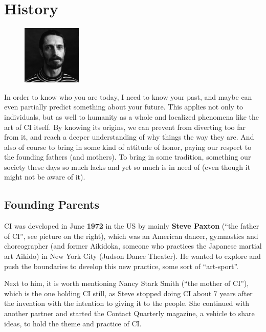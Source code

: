 \section{History}\label{sec:history}

\begin{figure}
\centering
\includegraphics[width=0.25\textwidth]{images/history}
\end{figure}

In order to know who you are today, I need to know your past, and maybe can even partially predict something about your future.
This applies not only to individuals, but as well to humanity as a whole and localized phenomena like the art of CI itself.
By knowing its origins, we can prevent from diverting too far from it, and reach a deeper understanding of why things the way they are.
And also of course to bring in some kind of attitude of honor, paying our respect to the founding fathers (and mothers).
To bring in some tradition, something our society these days so much lacks and yet so much is in need of (even though it might not be aware of it).

\subsection{Founding Parents}\label{subsec:founding-parents}

CI was developed in June \textbf{1972} in the US by mainly \textbf{Steve Paxton} (``the father of CI'', see picture on the right), which was an American dancer, gymnastics and choreographer (and former Aikidoka, someone who practices the Japanese martial art Aikido) in New York City (Judson Dance Theater).
He wanted to explore and push the boundaries to develop this new practice, some sort of ``art-sport''.

Next to him, it is worth mentioning Nancy Stark Smith (``the mother of CI''), which is the one holding CI still, as Steve stopped doing CI about 7 years after the invention with the intention to giving it to the people.
She continued with another partner and started the Contact Quarterly magazine, a vehicle to share ideas, to hold the theme and practice of CI.

